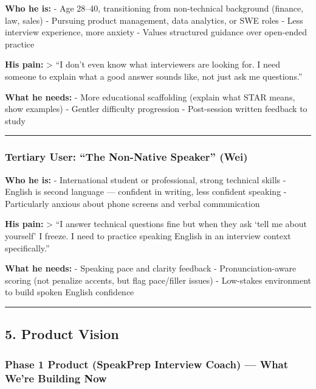 \documentclass[
  11pt,
]{article}
\begin{document}
\textbf{Who he is:} - Age 28--40, transitioning from non-technical
background (finance, law, sales) - Pursuing product management, data
analytics, or SWE roles - Less interview experience, more anxiety -
Values structured guidance over open-ended practice

\textbf{His pain:} \textgreater{} ``I don't even know what interviewers
are looking for. I need someone to explain what a good answer sounds
like, not just ask me questions.''

\textbf{What he needs:} - More educational scaffolding (explain what
STAR means, show examples) - Gentler difficulty progression -
Post-session written feedback to study

\begin{center}\rule{0.5\linewidth}{0.5pt}\end{center}

\hypertarget{tertiary-user-the-non-native-speaker-wei}{%
\subsubsection{Tertiary User: ``The Non-Native Speaker''
(Wei)}\label{tertiary-user-the-non-native-speaker-wei}}

\textbf{Who he is:} - International student or professional, strong
technical skills - English is second language --- confident in writing,
less confident speaking - Particularly anxious about phone screens and
verbal communication

\textbf{His pain:} \textgreater{} ``I answer technical questions fine
but when they ask `tell me about yourself' I freeze. I need to practice
speaking English in an interview context specifically.''

\textbf{What he needs:} - Speaking pace and clarity feedback -
Pronunciation-aware scoring (not penalize accents, but flag pace/filler
issues) - Low-stakes environment to build spoken English confidence

\begin{center}\rule{0.5\linewidth}{0.5pt}\end{center}

\hypertarget{product-vision}{%
\subsection{5. Product Vision}\label{product-vision}}

\hypertarget{phase-1-product-speakprep-interview-coach-what-were-building-now}{%
\subsubsection{Phase 1 Product (SpeakPrep Interview Coach) --- What
We're Building
Now}\label{phase-1-product-speakprep-interview-coach-what-were-building-now}}
\end{document}
